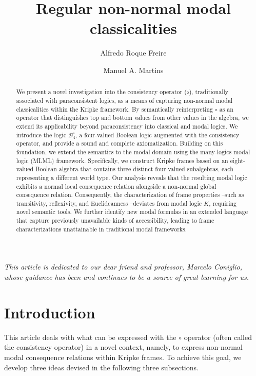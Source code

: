 \documentclass{amsart}
\author{Alfredo Roque Freire}
\author{Manuel A. Martins}
\title{Regular non-normal modal classicalities}
\begin{document}
\begin{abstract}
We present a novel investigation into the consistency operator ($\circ$), traditionally associated with paraconsistent logics, as a means of capturing non-normal modal classicalities within the Kripke framework. By semantically reinterpreting $\circ$ as an operator that distinguishes top and bottom values from other values in the algebra, we extend its applicability beyond paraconsistency into classical and modal logics. We introduce the logic $\mathcal{B}_4^\circ$, a four-valued Boolean logic augmented with the consistency operator, and provide a sound and complete axiomatization. Building on this foundation, we extend the semantics to the modal domain using the many-logics modal logic (MLML) framework. Specifically, we construct Kripke frames based on an eight-valued Boolean algebra that contains three distinct four-valued subalgebras, each representing a different world type. Our analysis reveals that the resulting modal logic exhibits a normal local consequence relation alongside a non-normal global consequence relation. Consequently, the characterization of frame properties --such as transitivity, reflexivity, and Euclideanness --deviates from modal logic $K$, requiring novel semantic tools. We further identify new modal formulas in an extended language that capture previously unavailable kinds of accessibility, leading to frame characterizations unattainable in traditional modal frameworks.
\end{abstract}

\maketitle

\vspace{0.5cm}

\textit{This article is dedicated to our dear friend and professor, Marcelo Coniglio, whose guidance has been and continues to be a source of great learning for us.}

\section{Introduction}

This article deals with what can be expressed with the $\circ$ operator (often called the consistency operator) in a novel context, namely, to express non-normal modal consequence relations within Kripke frames. To achieve this goal, we develop three ideas devised in the following three subsections.
\end{document}
